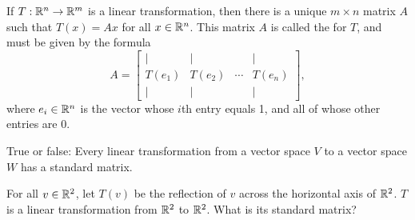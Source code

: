



\edXsolution{ 

}


\endedxproblem


\endedxvertical










If $T: \mathbb R^n \rightarrow \mathbb R^m$ is a linear transformation, then there is a unique $m \times n$ matrix
$A$ such that $T(x) = Ax$ for all $x\in \mathbb R^n$.  This matrix $A$
is called the {} for $T$, and must be given by the formula
\[A =  \left[ \begin{array}{cccc} | & | & & | \\ 
T(e_1) & T(e_2) & \cdots & T(e_n) \\
 | & | & & | \end{array} \right], \]
 where $e_i \in \mathbb R^n$ is the vector whose $i$th entry equals 1, and all of whose other entries are 0.

\endedxtext

\endedxvertical








True or false: Every linear transformation from a vector space $V$ to a vector space $W$
has a standard matrix.  
 




\endedxproblem



For all $v\in \mathbb R^2$, let $T(v)$ be the reflection of $v$ across the horizontal axis of $\mathbb R^2$.  
$T$ is a linear transformation from $\mathbb R^2$ to $\mathbb R^2$.  What is its standard matrix?
 
